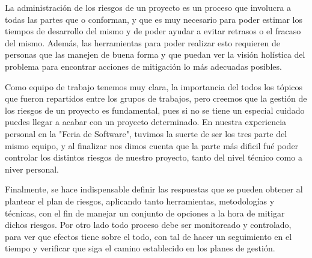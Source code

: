 La administración de los riesgos de un proyecto es un proceso que involucra a
todas las partes que o conforman, y que es muy necesario para poder estimar
los tiempos de desarrollo del mismo y de poder ayudar a evitar retrasos o el
fracaso del mismo. Además, las herramientas para poder realizar esto requieren de
personas que las manejen de buena forma y que puedan ver la visión holística
del problema para encontrar acciones de mitigación lo más adecuadas posibles.

Como equipo de trabajo tenemos muy clara, la importancia del todos los tópicos
que fueron repartidos entre los grupos de trabajos, pero creemos que la gestión
de los riesgos de un proyecto es fundamental, pues si no se tiene un especial cuidado
puedes llegar a acabar con un proyecto determinado.
En nuestra experiencia personal en la "Feria de Software", tuvimos la suerte de ser
los tres parte del mismo equipo, y al finalizar nos dimos cuenta que la parte más
dificil fué poder controlar los distintos riesgos de nuestro proyecto, tanto
del nivel técnico como a niver personal.

Finalmente, se hace indispensable definir las respuestas que se pueden obtener al 
plantear el plan de riesgos, aplicando tanto herramientas, metodologías y 
técnicas, con el fin de manejar un conjunto de opciones a la hora de mitigar dichos
riesgos. Por otro lado todo proceso debe ser monitoreado y controlado, para ver 
que efectos tiene sobre el todo, con tal de hacer un seguimiento en el tiempo y
verificar que siga el camino establecido en los planes de gestión.
